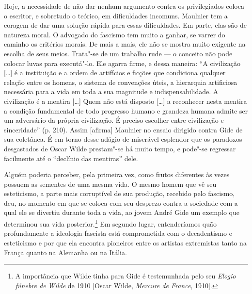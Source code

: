 Hoje, a necessidade de não dar nenhum argumento contra os
privilegiados coloca o escritor, e sobretudo o teórico, em dificuldades
incomuns. Maulnier tem a coragem de dar uma solução rápida para essas
dificuldades. Em parte, elas são de natureza moral. O advogado do
fascismo tem muito a ganhar, se varrer do caminho os critérios morais.
De mais a mais, ele não se mostra muito exigente na escolha de seus
meios. Trata"-se de um trabalho rude --- o conceito não pode colocar luvas
para executá"-lo. Ele agarra firme, e dessa maneira: ``A civilização
{[}\ldots{}{]} é a instituição e a ordem de artifícios e ficções que
condiciona qualquer relação entre os homens, o sistema de convenções
úteis, a hierarquia artificiosa necessária para a vida em toda a sua
magnitude e indispensabilidade. A civilização é a mentira {[}\ldots{}{]} Quem
não está disposto {[}\ldots{}{]} a reconhecer nesta mentira a condição
fundamental de todo progresso humano e grandeza humana admite ser um
adversário da própria civilização. É preciso escolher entre civilização
e sinceridade'' (p. 210). Assim {[}afirma{]} Maulnier no ensaio dirigido
contra Gide de sua coletânea. É em torno desse adágio de miserável
esplendor que os paradoxos desgastados de Oscar Wilde prestam"-se há
muito tempo, e pode"-se regressar facilmente até o ``declínio das
mentiras'' dele.

Alguém poderia perceber, pela primeira vez, como frutos diferentes às
vezes possuem as sementes de uma mesma vida. O mesmo homem que vê seu
esteticismo, a parte mais corruptível de sua produção, recebido pelo
fascismo, deu, no momento em que se coloca com seu desprezo contra a
sociedade com a qual ele se divertiu durante toda a vida, ao jovem
André Gide um exemplo que determinou sua vida posterior.\footnote{A
  importância que Wilde tinha para Gide é testemunhada pelo seu
  \emph{Elogio fúnebre de Wilde} de 1910 {[}Oscar Wilde, \emph{Mercure
  de France}, 1910{]}. \versal{[N. A.]}} Em segundo lugar, entenderíamos quão
profundamente a ideologia fascista está comprometida com o decadentismo
e esteticismo e por que ela encontra pioneiros entre os artistas
extremistas tanto na França quanto na Alemanha ou na Itália.

